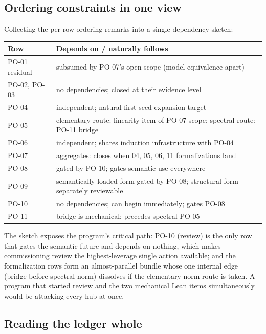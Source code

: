 \subsection{Ordering constraints in one view}

Collecting the per-row ordering remarks into a single dependency
sketch:

\begin{center}
\small
\begin{tabular}{@{}lp{8.6cm}@{}}
\toprule
Row & Depends on / naturally follows \\
\midrule
PO-01 residual & subsumed by PO-07's open scope (model equivalence apart) \\
PO-02, PO-03 & no dependencies; closed at their evidence level \\
PO-04 & independent; natural first seed-expansion target \\
PO-05 & elementary route: linearity item of PO-07 scope; spectral route: PO-11 bridge \\
PO-06 & independent; shares induction infrastructure with PO-04 \\
PO-07 & aggregates: closes when 04, 05, 06, 11 formalizations land \\
PO-08 & gated by PO-10; gates semantic use everywhere \\
PO-09 & semantically loaded form gated by PO-08; structural form separately reviewable \\
PO-10 & no dependencies; can begin immediately; gates PO-08 \\
PO-11 & bridge is mechanical; precedes spectral PO-05 \\
\bottomrule
\end{tabular}
\end{center}

The sketch exposes the program's critical path: PO-10 (review) is the
only row that gates the semantic future and depends on nothing, which
makes commissioning review the highest-leverage single action
available; and the formalization rows form an almost-parallel bundle
whose one internal edge (bridge before spectral norm) dissolves if
the elementary norm route is taken. A program that started review and
the two mechanical Lean items simultaneously would be attacking every
hub at once.

\subsection{Reading the ledger whole}

